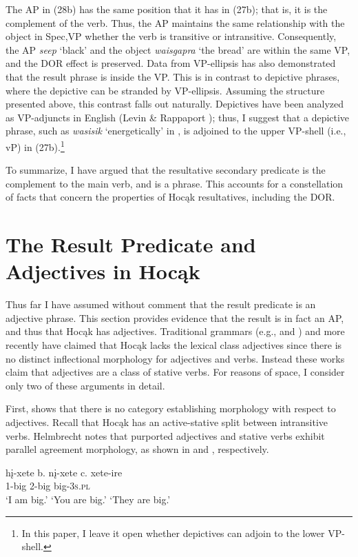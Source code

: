 \documentclass[output=paper]{LSP/langsci}
\begin{document}
The AP in (28b) has the same position that it has in (27b); that is, it is the complement of the verb. Thus, the AP maintains the same relationship with the object in Spec,VP whether the verb is transitive or intransitive. Consequently, the AP \textit{seep} `black' and the object \textit{waisgapra} `the bread' are within the same VP, and the DOR effect is preserved. Data from VP-ellipsis has also demonstrated that the result phrase is inside the VP. This is in contrast to depictive phrases, where the depictive can be stranded by VP-ellipsis. Assuming the structure presented above, this contrast falls out naturally. Depictives have been analyzed as VP-adjuncts in English (Levin \& Rappaport \citealt{Hovav1995}); thus, I suggest that a depictive phrase, such as \textit{wasisik} `energetically' in , is adjoined to the upper VP-shell (i.e., vP) in (27b).\footnote{In this paper, I leave it open whether depictives can adjoin to the lower VP-shell.}

To summarize, I have argued that the resultative secondary predicate is the complement to the main verb, and is a phrase. This accounts for a constellation of facts that concern the properties of Hocąk resultatives, including the DOR.

\section{The Result Predicate and Adjectives in Hocąk} 

Thus far I have assumed without comment that the result predicate is an adjective phrase. This section provides evidence that the result is in fact an AP, and thus that Hocąk has adjectives. Traditional grammars (e.g., \citealt{Lipkind1945} and \citealt{Susman1943}) and more recently \citet{Helmbrecht2006} have claimed that Hocąk lacks the lexical class adjectives since there is no distinct inflectional morphology for adjectives and verbs. Instead these works claim that adjectives are a class of stative verbs. For reasons of space, I consider only two of these arguments in detail.

First, \citet{Helmbrecht2006} shows that there is no category establishing morphology with respect to adjectives. Recall that Hocąk has an active-stative split between intransitive verbs. Helmbrecht notes that purported adjectives and stative verbs exhibit parallel agreement morphology, as shown in  and , respectively.

\begin{exe}
\ex
\begin{xlist}
\ex \gll
hį-xete \hspace{36pt} b. {}  nį-xete \hspace{48pt} c. {} xete-ire\\
1-big {} {} {} 2-big {} {}  {} big-\textsc{3s.pl}\\
\glt `I am big.' \hspace{1.2cm} `You are big.' \hspace{1.1cm} `They are big.'

\end{xlist}
\end{exe}
\end{document}
